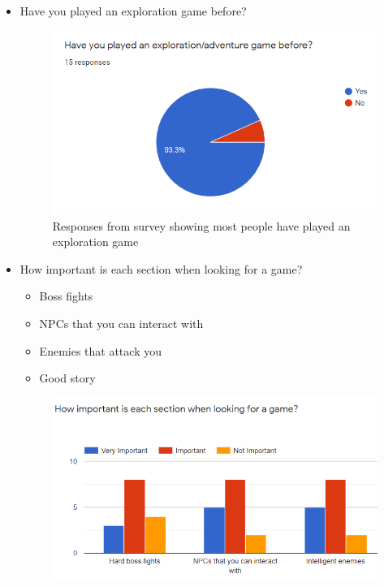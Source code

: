 \documentclass[../Main.tex]{subfiles}
\begin{document}
            \begin{itemize}
                \item Have you played an exploration game before?
                \begin{figure}[hbt!]
                    \centerline{\includegraphics[scale=0.9]{img/Survey/Played Exploration Game.PNG}}
                    \caption{Responses from survey showing most people have played an exploration game}
                    \label{fig:Question1}
                \end{figure}
                \item How important is each section when looking for a game?
                \begin{itemize}
                    \item Boss fights
                    \item NPCs that you can interact with
                    \item Enemies that attack you
                    \item Good story
                \end{itemize}
                \begin{figure}[hbt!]
                    \centerline{\includegraphics[scale=0.9]{img/Survey/Importance of games.PNG}}

\end{figure}
\end{itemize}
\end{document}
